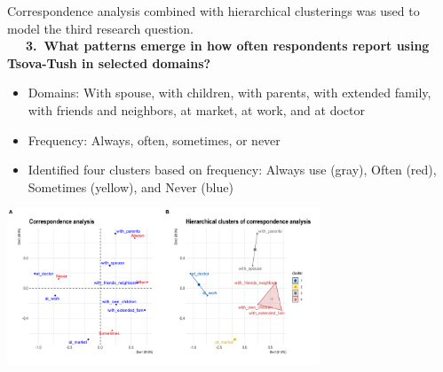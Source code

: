 \documentclass[portrait,fontscale=0.285,a0paper]{baposter2}
\newcommand{\compresslist}{ %
\setlength{\itemsep}{1pt}
\setlength{\parskip}{0pt}
\setlength{\parsep}{0pt}
}
\begin{document}
\begin{poster}
{{\footnotesize Correspondence analysis combined with hierarchical clusterings was used to model the third research question.\\

\vspace{-0.1in} \ \ \ \textbf{3.~What patterns emerge in how often respondents report using Tsova-Tush in selected domains?} 

\begin{itemize}[leftmargin=*]\compresslist
\item Domains: With spouse, with  children, with  parents, with extended family, with friends and neighbors, at market, at work, and at doctor
\item Frequency: Always, often, sometimes, or never
\item Identified four clusters based on frequency: Always use (gray), Often (red), Sometimes (yellow), and Never (blue)
\end{itemize}
}

\begin{center}

   \includegraphics[width=0.7\textwidth]{ca-clusters-full.png} \vspace{-0.3in}
\end{center}



}

















\end{poster}
\end{document}

